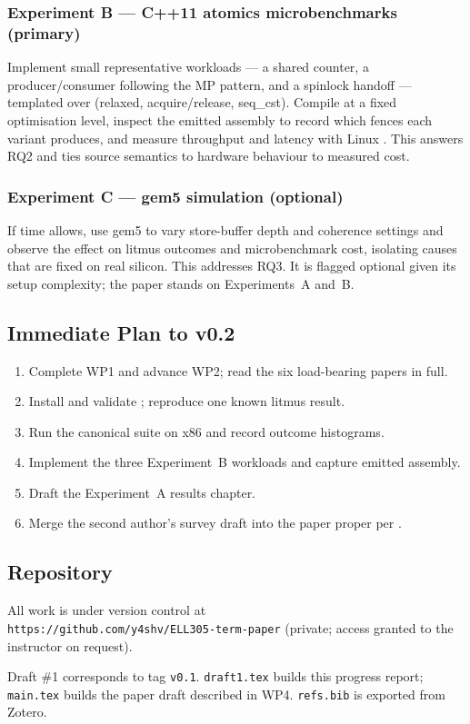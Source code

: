 \subsubsection*{Experiment B --- C++11 atomics microbenchmarks (primary)}

Implement small representative workloads --- a shared counter, a
producer/consumer following the MP pattern, and a spinlock handoff --- templated
over  (relaxed, acquire/release, seq\_cst).
Compile at a fixed optimisation level, inspect the emitted assembly to record
which fences each variant produces, and measure throughput and latency with
Linux .
This answers RQ2 and ties source semantics to hardware behaviour to measured
cost.

\subsubsection*{Experiment C --- gem5 simulation (optional)}

If time allows, use gem5 \cite{binkert2011gem5} to vary store-buffer depth and
coherence settings and observe the effect on litmus outcomes and microbenchmark
cost, isolating causes that are fixed on real silicon.
This addresses RQ3.
It is flagged optional given its setup complexity; the paper stands on
Experiments~A and~B.

\subsection{Immediate Plan to v0.2}

\begin{enumerate}[leftmargin=*,itemsep=2pt]
\item Complete WP1 and advance WP2; read the six load-bearing papers in full.
\item Install and validate ; reproduce one known litmus result.
\item Run the canonical suite on x86 and record outcome histograms.
\item Implement the three Experiment~B workloads and capture emitted assembly.
\item Draft the Experiment~A results chapter.
\item Merge the second author's survey draft into the paper proper per
  .
\end{enumerate}

\subsection{Repository}

All work is under version control at\\
\texttt{https://github.com/y4shv/ELL305-term-paper} (private; access granted to
the instructor on request).

\medskip
\noindent Draft \#1 corresponds to tag \texttt{v0.1}.
\texttt{draft1.tex} builds this progress report; \texttt{main.tex} builds the
paper draft described in WP4.
\texttt{refs.bib} is exported from Zotero.
